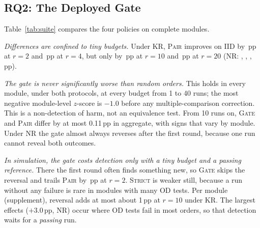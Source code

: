 \documentclass[conference,letterpaper]{IEEEtran}
\theoremstyle{definition}
\newcommand{\pp}{\,pp}
\newcommand{\IIDp}{\textup{\textsc{IID}}}
\newcommand{\PAIRp}{\textup{\textsc{Pair}}}
\newcommand{\GATEp}{\textup{\textsc{Gate}}}
\newcommand{\STRICTp}{\textup{\textsc{Strict}}}
\begin{document}
\begin{table}[t]
\caption{Suite-level detection (\% of \NTargets{} OD tests) and differences in percentage points with 95\% CI half-widths (S1).}\label{tab:suite}
\centering\small
\setlength{\tabcolsep}{2.4pt}
\end{table}

\subsection{RQ2: The Deployed Gate}
Table~\ref{tab:suite} compares the four policies on complete modules.

\emph{Differences are confined to tiny budgets.} Under KR, \PAIRp{} improves on \IIDp{} by \KRPairMinusIidTwo\pp{} at $r=2$ and \KRPairMinusIidFour\pp{} at $r=4$, but only by \KRPairMinusIidTen\pp{} at $r=10$ and \KRPairMinusIidTwenty\pp{} at $r=20$ (NR: \NRPairMinusIidTwo, \NRPairMinusIidFour, \NRPairMinusIidTen, \NRPairMinusIidTwenty\pp).

\emph{The gate is never significantly worse than random orders.} This holds in every module, under both protocols, at every budget from 1 to 40 runs; the most negative module-level $z$-score is $-1.0$ before any multiple-comparison correction. This is a non-detection of harm, not an equivalence test. From 10 runs on, \GATEp{} and \PAIRp{} differ by at most 0.11\pp{} in aggregate, with signs that vary by module. Under NR the gate almost always reverses after the first round, because one run cannot reveal both outcomes.

\emph{In simulation, the gate costs detection only with a tiny budget and a passing reference.} There the first round often finds something new, so \GATEp{} skips the reversal and trails \PAIRp{} by \KRPairMinusGateTwo\pp{} at $r=2$. \STRICTp{} is weaker still, because a run without any failure is rare in modules with many OD tests. Per module (supplement), reversal adds at most about 1\pp{} at $r=10$ under KR. The largest effects ($+3.0$\pp, NR) occur where OD tests fail in most orders, so that detection waits for a \emph{passing} run.
\end{document}

